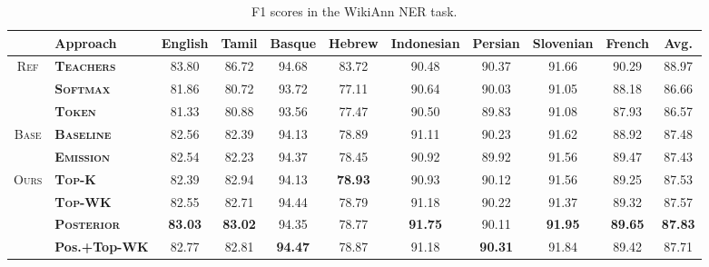 \documentclass[11pt,a4paper]{article}
\begin{document}
\begin{table*}[t!]
\centering
\setlength\tabcolsep{2.5pt}
\small
\begin{tabular}{c|l|cccccccc|c}
\hline\hline
& \bf Approach & \bf English    & \bf Tamil    & \bf Basque    & \bf Hebrew    & \bf Indonesian    & \bf Persian    & \bf Slovenian    & \bf French    & \bf Avg.   \\
\hline
\multirow{3}{*}{\textsc{Ref}}& \bf \textsc{Teachers}           & 83.80 & 86.72 & 94.68 & 83.72 & 90.48 & 90.37 & 91.66 & 90.29 & 88.97 \\
&\bf \textsc{Softmax} & 81.86 & 80.72 & 93.72 & 77.11 & 90.64 & 90.03 & 91.05 & 88.18 & 86.66 \\
& \bf \textsc{Token} & 81.33 & 80.88 & 93.56 & 77.47 & 90.50 & 89.83 & 91.08 & 87.93 & 86.57 \\
\hline
\multirow{2}{*}{\textsc{Base}}& \bf \textsc{Baseline}               & 82.56 & 82.39 & 94.13 & 78.89 & 91.11 & 90.23 & 91.62 & 88.92 & 87.48 \\
& \bf \textsc{Emission}            & 82.54 & 82.23 & 94.37 & 78.45 & 90.92 & 89.92 & 91.56 & 89.47 & 87.43 \\
\hline
\multirow{4}{*}{\textsc{Ours}}& \bf \textsc{Top-K}                   & 82.39 & 82.94 & 94.13 & \textbf{78.93} & 90.93 & 90.12 & 91.56 & 89.25 & 87.53 \\
& \bf \textsc{Top-WK}      & 82.55 & 82.71 & 94.44 & 78.79 & 91.18 & 90.22 & 91.37 & 89.32 & 87.57 \\
& \bf \textsc{Posterior}              & \textbf{83.03} & \textbf{83.02} & 94.35 & 78.77 & \textbf{91.75} & 90.11 & \textbf{91.95} & \textbf{89.65} & \textbf{87.83} \\
& \bf Pos.+Top-WK & 82.77 & 82.81 & \textbf{94.47} & 78.87 & 91.18 & \textbf{90.31} & 91.84 & 89.42 & 87.71 \\
\hline\hline
\end{tabular}
\caption{F1 scores in the WikiAnn NER task.}
\label{tab:wikiann}
\end{table*}
\end{document}
